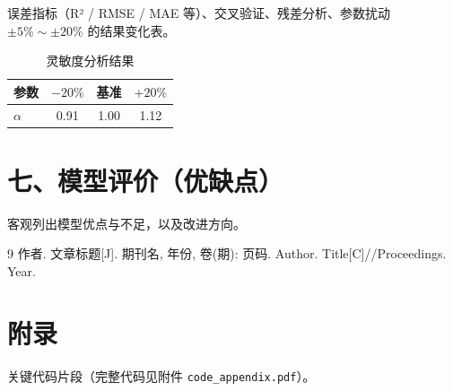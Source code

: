 \documentclass[12pt]{ctexart}
\begin{document}
误差指标（R² / RMSE / MAE 等）、交叉验证、残差分析、参数扰动 $\pm 5\% \sim \pm 20\%$ 的结果变化表。

\begin{table}[H]
\centering
\caption{灵敏度分析结果}
\begin{tabular}{lccc}
\toprule
参数 & $-20\%$ & 基准 & $+20\%$ \\
\midrule
$\alpha$ & 0.91 & 1.00 & 1.12 \\
\bottomrule
\end{tabular}
\end{table}

\section*{七、模型评价（优缺点）}

客观列出模型优点与不足，以及改进方向。

\begin{thebibliography}{9}
   作者. 文章标题[J]. 期刊名, 年份, 卷(期): 页码.
   Author. Title[C]//Proceedings. Year.
\end{thebibliography}

\section*{附录}

关键代码片段（完整代码见附件 \texttt{code\_appendix.pdf}）。
\end{document}
